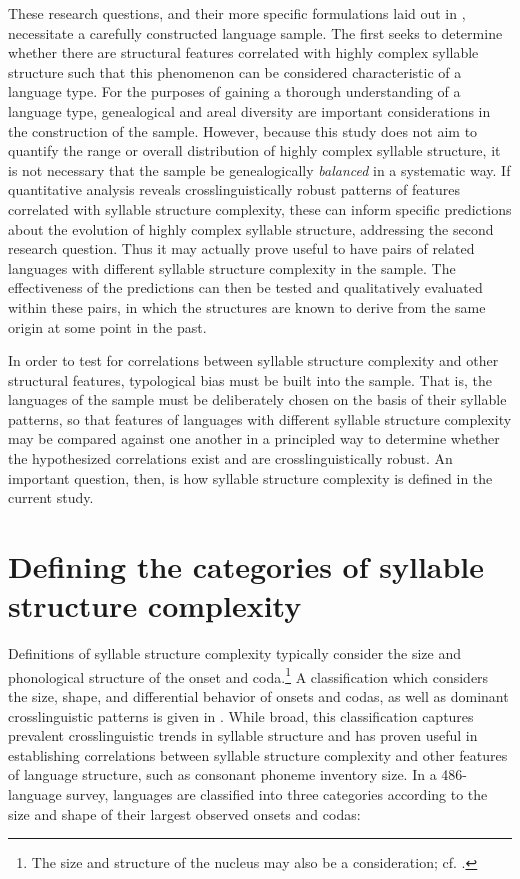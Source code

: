   These research questions, and their more specific formulations laid out in , necessitate a carefully constructed language sample. The first seeks to determine whether there are structural features correlated with highly complex syllable structure such that this phenomenon can be considered characteristic of a language type. For the purposes of gaining a thorough understanding of a language type, genealogical and areal diversity are important considerations in the construction of the sample. However, because this study does not aim to quantify the range or overall distribution of highly complex syllable structure, it is not necessary that the sample be genealogically \textit{balanced} in a systematic way. If quantitative analysis reveals crosslinguistically robust patterns of features correlated with syllable structure complexity, these can inform specific predictions about the evolution of highly complex syllable structure, addressing the second research question. Thus it may actually prove useful to have pairs of related languages with different syllable structure complexity in the sample. The effectiveness of the predictions can then be tested and qualitatively evaluated within these pairs, in which the structures are known to derive from the same origin at some point in the past.

  In order to test for correlations between syllable structure complexity and other structural features, typological bias \citep[12]{Comrie1989} must be built into the sample. That is, the languages of the sample must be deliberately chosen on the basis of their syllable patterns, so that features of languages with different syllable structure complexity may be compared against one another in a principled way to determine whether the hypothesized correlations exist and are crosslinguistically robust. An important question, then, is how syllable structure complexity is defined in the current study.

\section{Defining the categories of syllable structure complexity}\label{sec:2.2}

  Definitions of syllable structure complexity typically consider the size and phonological structure of the onset and coda.\footnote{{The size and structure of the nucleus may also be a consideration; cf. \citet{MaddiesonEtAl2013}.}} A classification which considers the size, shape, and differential behavior of onsets and codas, as well as dominant crosslinguistic patterns is given in \citet{Maddieson2013a}. While broad, this classification captures prevalent crosslinguistic trends in syllable structure and has proven useful in establishing correlations between syllable structure complexity and other features of language structure, such as consonant phoneme inventory size. In a 486-language survey, languages are classified into three categories according to the size and shape of their largest observed onsets and codas: 

